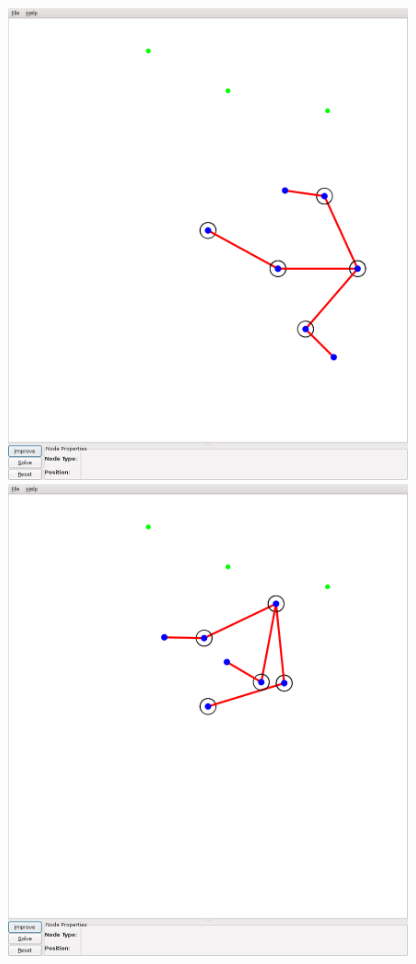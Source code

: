 \documentclass{article}
\begin{document}
    \begin{center}
        \includegraphics[width=400px]{pose_1.png} \\
        \includegraphics[width=400px]{pose_2.png} \\

\end{center}
\end{document}
